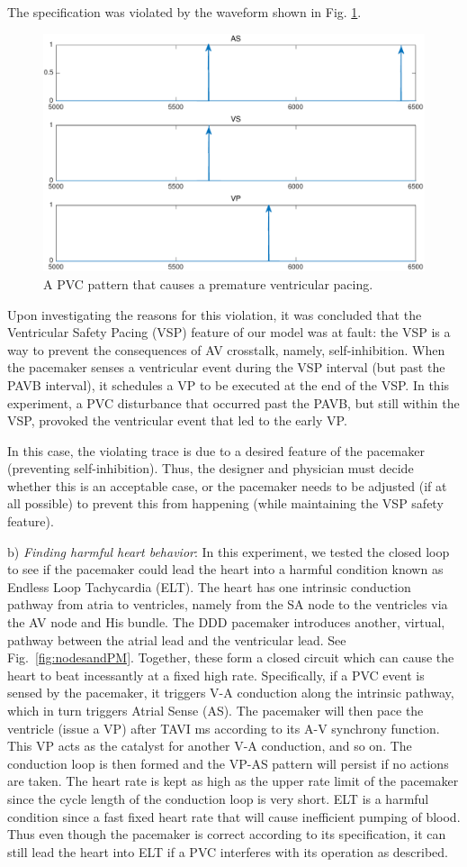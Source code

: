 The specification was violated by the waveform shown in Fig. \ref{fig:bug8_kept1}.
\begin{figure}[tb]
\centering
\includegraphics[width=0.7\linewidth]{figures/bug8_kept1}
\caption{A PVC pattern that causes a premature ventricular pacing.}
\label{fig:bug8_kept1}
\end{figure}
Upon investigating the reasons for this violation, it was concluded that the Ventricular Safety Pacing (VSP) feature of our model was at fault: the VSP is a way to prevent the consequences of AV crosstalk, namely, self-inhibition. 
When the pacemaker senses a ventricular event during the VSP interval (but past the PAVB interval), it schedules a VP to be executed at the end of the VSP.
In this experiment, a PVC disturbance that occurred past the PAVB, but still within the VSP, provoked the ventricular event that led to the early VP.

In this case, the violating trace is due to a desired feature of the pacemaker (preventing self-inhibition).
Thus, the designer and physician must decide whether this is an acceptable case, or the pacemaker needs to be adjusted (if at all possible) to prevent this from happening (while maintaining the VSP safety feature).

b) \emph{Finding harmful heart behavior}: In this experiment, we tested the closed loop to see if the pacemaker could lead the heart into a harmful condition known as Endless Loop Tachycardia (ELT).
%
The heart has one intrinsic conduction pathway from atria to ventricles, namely from the SA node to the ventricles via the AV node and His bundle.
The DDD pacemaker introduces another, virtual, pathway between the atrial lead and the ventricular lead.
See Fig.~\ref{fig:nodesandPM}.
Together, these form a closed circuit which can cause the heart to beat incessantly at a fixed high rate.
Specifically, if a PVC event is sensed by the pacemaker, it triggers V-A conduction along the intrinsic pathway, 
which in turn triggers Atrial Sense (AS). 
The pacemaker will then pace the ventricle (issue a VP) after TAVI ms according to its A-V synchrony function. 
This VP acts as the catalyst for another V-A conduction, and so on.
The conduction loop is then formed and the VP-AS pattern will persist if no actions are taken.
The heart rate is kept as high as the upper rate limit of the pacemaker since the cycle length of the conduction loop is very short. 
ELT is a harmful condition since a fast fixed heart rate that will cause inefficient pumping of blood.
Thus even though the pacemaker is correct according to its specification, it can still lead the heart into ELT if a PVC interferes with its operation as described.
%


